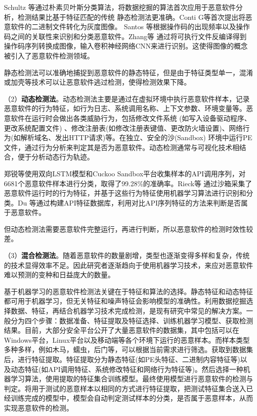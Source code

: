Schultz 等\cite{schultz2000data}通过朴素贝叶斯分类算法，将数据挖掘的算法首次应用于恶意软件分析，检测结果比基于特征匹配的传统
静态检测法更准确。Conti G等\cite{2010Automated}首次提出将恶意软件的二进制文件转化为灰度图像。 
Santos 等\cite{2013Opcode}根据操作码的出现频率以及操作码之间的关联性来识别和分类恶意软件。Zhang等\cite{2017IRMD} 通过将可执行文件反编译得到操作码序列转换成图像，输入卷积神经网络CNN来进行识别。这使得图像的概念被引入了恶意软件检测领域。 
      
静态检测法可以准确地捕捉到恶意软件的静态特征，但是由于特征类型单一，混淆或加壳等技术可以让恶意软件逃过检测，使得检测效果下降。

（2）\textbf{动态检测法}。动态检测法主要是通过在虚拟环境中执行恶意软件样本，记录恶意软件的行为特征，如行为日志、系统调用名称、上下文参数、环境变量等\cite{周杨2020基于线程融合特征的}。恶意软件在运行时会做出各类威胁行为，包括修改文件系统 (如写入设备驱动程序、更改系统配置文件) 、修改注册表(如修改注册表键值、更改防火墙设置)、网络行为(如解析域名、发出HTTP请求)等。在独立、安全的沙(Sandbox) 环境中运行PE文件，通过行为分析来判定其是否为恶意软件。动态检测通常与可视化技术相结合，便于分析动态行为轨迹。 
 
郑锐等\cite{郑锐2020一种基于深度学习的恶意软件家族分类模型}使用双向LSTM模型和Cuckoo Sandbox平台收集样本的API调用序列，对6681个恶意软件样本进行分类，取得了99.28\%的准确率。Rieck等\cite{2011Automatic} 通过沙箱采集了恶意软件运行时的行为特征，并基于这些行为特征使用机器学习算法进行识别和分类。Du 等\cite{Du2019A}通过构建API特征数据库，利用对比API序列特征的方法来判断是否属于恶意软件。
 
但动态检测法需要恶意软件完整运行，再进行判断，所以恶意软件的检测时效性较差。

（3）\textbf{混合检测法}。随着恶意软件的数量剧增，类型也逐渐变得多样和复杂，传统的技术显得效率不足。因此研究者逐渐趋向于使用机器学习技术，来应对恶意软件难以预测的变种和日益庞大的数量。

基于机器学习的恶意软件检测法关键在于特征和算法的选择。静态特征和动态特征都可用于机器学习，但无关特征和噪声特征会影响模型的准确性。利用数据挖掘选择数据、特征，再结合机器学习技术完成检测，是现有研究中常见的解决方案。一般分为四个步骤：数据准备、特征提取及特征选择、训练机器学习模型、获取检测结果。目前，大部分安全平台公开了大量恶意软件的数据集，其中包括可以在Windows平台，Linux平台以及移动端等各个环境下运行的恶意样本。而样本类型多种多样，例如木马，蠕虫，后门等，可以根据当前需求进行筛选。获取到数据集后，进行特征提取。特征提取分为静态特征(如PE头特征、二进制内容特征等)以及动态特征(如API调用特征、系统修改特征和网络行为特征等)。然后选择一种机器学习算法，使用提取的特征集合训练模型。最终使用模型进行恶意软件的检测与判定。将用于测试的恶意样本以相同的方式进行特征提取，把测试特征集合送入已经训练完成的模型中，模型会自动判定测试样本的分类，是否属于恶意样本，从而实现恶意软件的检测。 


